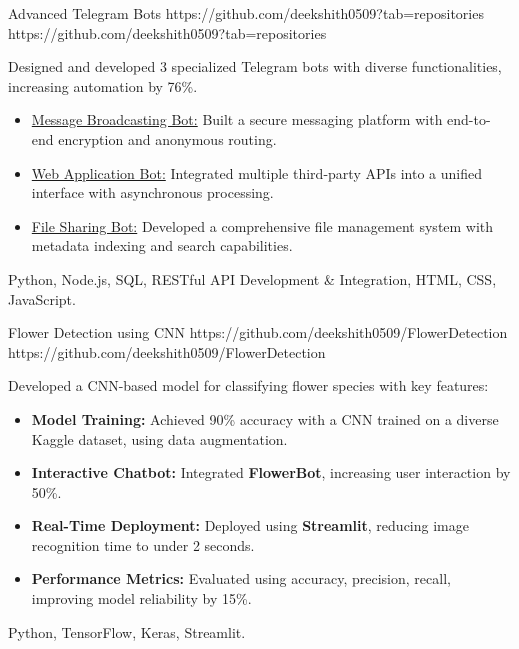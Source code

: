 \documentclass[a4paper,10pt]{article}
\begin{document}
\projectentry
{Advanced Telegram Bots}
{https://github.com/deekshith0509?tab=repositories}
{https://github.com/deekshith0509?tab=repositories}
{Designed and developed 3 specialized Telegram bots with diverse functionalities, increasing automation by 76\%.
\begin{itemize}
    \vspace{2pt}
    \item \href{https://github.com/deekshith0509/MessageBroadcasting_Bot}{Message Broadcasting Bot:} Built a secure messaging platform with end-to-end encryption and anonymous routing.
    \vspace{2pt}
    \item \href{https://github.com/deekshith0509/WebApplication_Bot}{Web Application Bot:} Integrated multiple third-party APIs into a unified interface with asynchronous processing.
    \vspace{2pt}
    \item \href{https://github.com/deekshith0509/Fileforwardbot}{File Sharing Bot:} Developed a comprehensive file management system with metadata indexing and search capabilities.
\end{itemize}  
}{Python, Node.js, SQL, RESTful API Development \& Integration, HTML, CSS, JavaScript.}






\vspace{10pt}

\iffalse  %
\projectentry
{Flower Detection using CNN}
{https://github.com/deekshith0509/FlowerDetection}
{https://github.com/deekshith0509/FlowerDetection}
{Developed a CNN-based model for classifying flower species with key features:
\begin{itemize}
\item \textbf{Model Training:} Achieved 90\% accuracy with a CNN trained on a diverse Kaggle dataset, using data augmentation.
    \item \textbf{Interactive Chatbot:} Integrated \textbf{FlowerBot}, increasing user interaction by 50\%.
    \item \textbf{Real-Time Deployment:} Deployed using \textbf{Streamlit}, reducing image recognition time to under 2 seconds.
    \item \textbf{Performance Metrics:} Evaluated using accuracy, precision, recall, improving model reliability by 15\%.
\end{itemize}
}
{Python, TensorFlow, Keras, Streamlit.}
\end{document}
